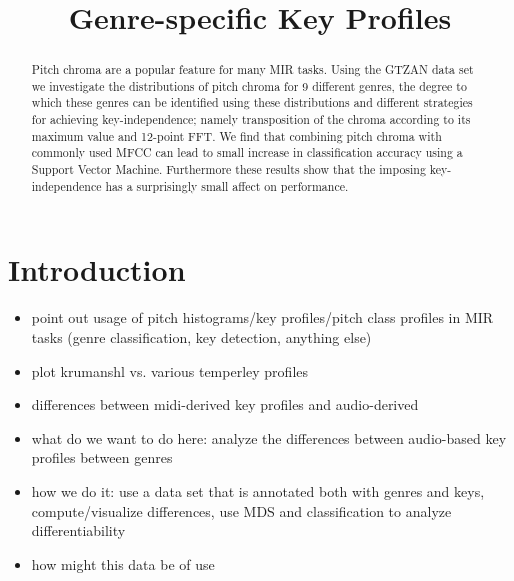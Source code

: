 \documentclass{article}
\title{Genre-specific Key Profiles}
\begin{document}
%
\maketitle
%
\begin{abstract}
Pitch chroma are a popular feature for many MIR tasks. Using the GTZAN data set we investigate the distributions of pitch chroma for 9 different genres, the degree to
which these genres can be identified using these distributions and different strategies for achieving key-independence; namely transposition of the chroma according to its maximum value and 12-point FFT. We find that combining pitch chroma with commonly used MFCC can lead to small increase in classification accuracy using a Support Vector Machine. Furthermore these results show that the imposing key-independence has a surprisingly small affect on performance.
\end{abstract}
%
\section{Introduction}\label{sec:introduction}
\begin{itemize}
    \item   point out usage of pitch histograms/key profiles/pitch class profiles in MIR tasks (genre classification, key detection, anything else)
    \item   plot krumanshl vs. various temperley profiles
    \item   differences between midi-derived key profiles and audio-derived \cite{purwins_new_2000, gomez_tonal_2006}
    \item   what do we want to do here: analyze the differences between audio-based key profiles between genres
    \item   how we do it: use a data set that is annotated both with genres and keys, compute/visualize differences, use MDS and classification to analyze differentiability
    \item   how might this data be of use
\end{itemize}
\end{document}
